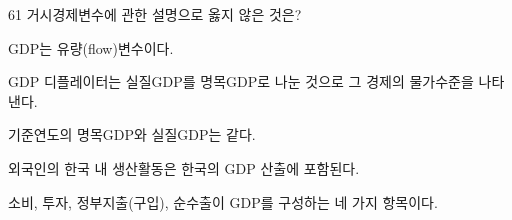 \begin{question}{61}
거시경제변수에 관한 설명으로 옳지 않은 것은?
\begin{choices}
  \item GDP는 유량(flow)변수이다.
  \item GDP 디플레이터는 실질GDP를 명목GDP로 나눈 것으로 그 경제의 물가수준을 나타낸다.
  \item 기준연도의 명목GDP와 실질GDP는 같다.
  \item 외국인의 한국 내 생산활동은 한국의 GDP 산출에 포함된다.
  \item 소비, 투자, 정부지출(구입), 순수출이 GDP를 구성하는 네 가지 항목이다.
\end{choices}
\end{question}
